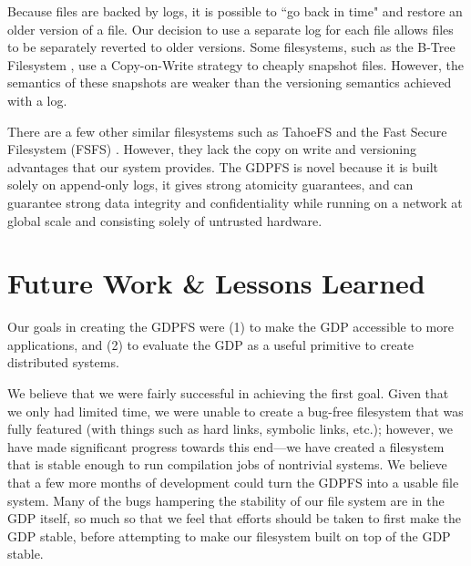 \documentclass{acm_proc_article-sp}
\begin{document}
Because files are backed by logs, it is possible to ``go back in time" and restore an older version of a file. Our decision to use a separate log for each file allows files to be separately reverted to older versions. Some filesystems, such as the B-Tree Filesystem \cite{BTRFS}, use a Copy-on-Write strategy to cheaply snapshot files. However, the semantics of these snapshots are weaker than the versioning semantics achieved with a log.

There are a few other similar filesystems such as TahoeFS \cite{Tahoe} and the Fast Secure Filesystem (FSFS) \cite{FSFS}. However, they lack the copy on write and versioning advantages that our system provides. The GDPFS is novel because it is built solely on append-only logs, it gives strong atomicity guarantees, and can guarantee strong data integrity and confidentiality while running on a network at global scale and consisting solely of untrusted hardware.

\section{Future Work \& Lessons Learned}
Our goals in creating the GDPFS were (1) to make the GDP accessible to more applications, and (2) to evaluate the GDP as a useful primitive to create distributed systems.

We believe that we were fairly successful in achieving the first goal. Given that we only had limited time, we were unable to create a bug-free filesystem that was fully featured (with things such as hard links, symbolic links, etc.); however, we have made significant progress towards this end---we have created a filesystem that is stable enough to run compilation jobs of nontrivial systems. We believe that a few more months of development could turn the GDPFS into a usable file system. Many of the bugs hampering the stability of our file system are in the GDP itself, so much so that we feel that efforts should be taken to first make the GDP stable, before attempting to make our filesystem built on top of the GDP stable.
\end{document}

